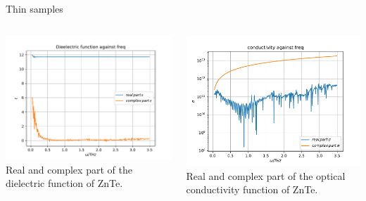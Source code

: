 \documentclass[aspectratio=1610, 9pt]{beamer}
\begin{document}
\begin{frame}{Thin samples}
  \begin{columns}
    \begin{column}{0.5\textwidth}
      \includegraphics[width=\textwidth]{images/ZnTe1mm_purged_nofilter/epsilon.pdf}
      {Real and complex part of the dielectric function of ZnTe.}
    \end{column} 
    \begin{column}{0.5\textwidth}
      \includegraphics[width=\textwidth]{images/ZnTe1mm_purged_nofilter/sigma.pdf}
      {Real and complex part of the optical conductivity function of ZnTe.}
    \end{column}
  \end{columns}
\end{frame}
\end{document}

